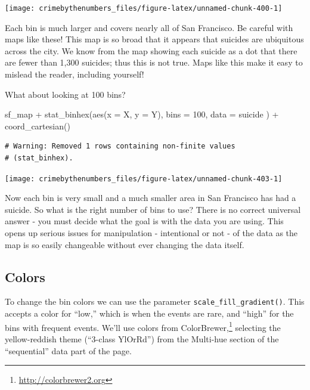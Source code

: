 \documentclass[
]{krantz}
\makeatletter
\newenvironment{Shaded}{\begin{snugshade}}{\end{snugshade}}
\newcommand{\AttributeTok}[1]{\textcolor[rgb]{0.61,0.61,0.61}{#1}}
\newcommand{\DecValTok}[1]{\textcolor[rgb]{0.06,0.06,0.06}{#1}}
\newcommand{\FunctionTok}[1]{\textcolor[rgb]{0,0,0}{#1}}
\newcommand{\NormalTok}[1]{#1}
\newcommand{\SpecialCharTok}[1]{\textcolor[rgb]{0,0,0}{#1}}
\renewcommand{\href}[2]{#2\footnote{\url{#1}}}
\newenvironment{kframe}{%
\medskip{}
\setlength{\fboxsep}{.8em}
 \def\at@end@of@kframe{}%
 \ifinner\ifhmode%
  \def\at@end@of@kframe{\end{minipage}}%
  \begin{minipage}{\columnwidth}%
 \fi\fi%
 \def\FrameCommand##1{\hskip\@totalleftmargin \hskip-\fboxsep
 \colorbox{shadecolor}{##1}\hskip-\fboxsep
     \hskip-\linewidth \hskip-\@totalleftmargin \hskip\columnwidth}%
 \MakeFramed {\advance\hsize-\width
   \@totalleftmargin\z@ \linewidth\hsize
   \@setminipage}}%
 {\par\unskip\endMakeFramed%
 \at@end@of@kframe}
\renewenvironment{Shaded}{\begin{kframe}}{\end{kframe}}
\makeatother
\begin{document}
\begin{center}\texttt{[image: crimebythenumbers\_files/figure-latex/unnamed-chunk-400-1]} \end{center}

Each bin is much larger and covers nearly all of San
Francisco. Be careful with maps like these! This map is so
broad that it appears that suicides are ubiquitous across
the city. We know from the map showing each suicide as a dot
that there are fewer than 1,300 suicides; thus this is not
true. Maps like this make it easy to mislead the reader,
including yourself!

What about looking at 100 bins?

\begin{Shaded}
\begin{Highlighting}[]
\NormalTok{sf\_map }\SpecialCharTok{+}
  \FunctionTok{stat\_binhex}\NormalTok{(}\FunctionTok{aes}\NormalTok{(}\AttributeTok{x =}\NormalTok{ X, }\AttributeTok{y =}\NormalTok{ Y),}
    \AttributeTok{bins =} \DecValTok{100}\NormalTok{,}
    \AttributeTok{data =}\NormalTok{ suicide}
\NormalTok{  ) }\SpecialCharTok{+}
  \FunctionTok{coord\_cartesian}\NormalTok{()}
\end{Highlighting}
\end{Shaded}

\begin{verbatim}
# Warning: Removed 1 rows containing non-finite values
# (stat_binhex).
\end{verbatim}

\begin{center}\texttt{[image: crimebythenumbers\_files/figure-latex/unnamed-chunk-403-1]} \end{center}

Now each bin is very small and a much smaller area in San
Francisco has had a suicide. So what is the right number of
bins to use? There is no correct universal answer - you must
decide what the goal is with the data you are using. This
opens up serious issues for manipulation - intentional or
not - of the data as the map is so easily changeable without
ever changing the data itself.

\hypertarget{colors}{%
\subsection{Colors}\label{colors}}

To change the bin colors we can use the parameter
\texttt{scale\_fill\_gradient()}. This accepts a color for
``low,'' which is when the events are rare, and ``high'' for
the bins with frequent events. We'll use colors from
\href{http://colorbrewer2.org}{ColorBrewer,} selecting the
yellow-reddish theme (``3-class YlOrRd'') from the Multi-hue
section of the ``sequential'' data part of the page.
\end{document}
